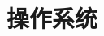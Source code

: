 \documentclass[../../interview-questions.tex]{subfiles}
\begin{document}
\section{操作系统}


\end{document}
